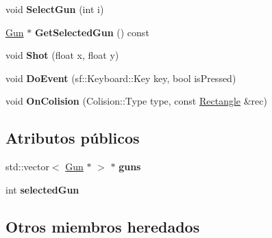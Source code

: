 \begin{DoxyCompactItemize}
\item 
\hypertarget{classPlayer_ade865da0a877ed80544a8980d5bfe6c3}{void {\bfseries Select\-Gun} (int i)}\label{classPlayer_ade865da0a877ed80544a8980d5bfe6c3}

\item 
\hypertarget{classPlayer_a00d075436bc7b9f0e7cfb8f61eadd42b}{\hyperlink{classGun}{Gun} $\ast$ {\bfseries Get\-Selected\-Gun} () const }\label{classPlayer_a00d075436bc7b9f0e7cfb8f61eadd42b}

\item 
\hypertarget{classPlayer_a38b8edc101cf42990dd1ed91c1ae02af}{void {\bfseries Shot} (float x, float y)}\label{classPlayer_a38b8edc101cf42990dd1ed91c1ae02af}

\item 
\hypertarget{classPlayer_adfd1228493c13be267e20fb06aaab45c}{void {\bfseries Do\-Event} (sf\-::\-Keyboard\-::\-Key key, bool is\-Pressed)}\label{classPlayer_adfd1228493c13be267e20fb06aaab45c}

\item 
\hypertarget{classPlayer_abf2ac31c8cd39d8c675d13edf736251f}{void {\bfseries On\-Colision} (Colision\-::\-Type type, const \hyperlink{classRectangle}{Rectangle} \&rec)}\label{classPlayer_abf2ac31c8cd39d8c675d13edf736251f}

\end{DoxyCompactItemize}
\subsection*{Atributos públicos}
\begin{DoxyCompactItemize}
\item 
\hypertarget{classPlayer_ac52a873571f7739cbc506253a3c72660}{std\-::vector$<$ \hyperlink{classGun}{Gun} $\ast$ $>$ $\ast$ {\bfseries guns}}\label{classPlayer_ac52a873571f7739cbc506253a3c72660}

\item 
\hypertarget{classPlayer_a263ff9a2e3d008f3d92013bf9aa3bbb1}{int {\bfseries selected\-Gun}}\label{classPlayer_a263ff9a2e3d008f3d92013bf9aa3bbb1}

\end{DoxyCompactItemize}
\subsection*{Otros miembros heredados}


